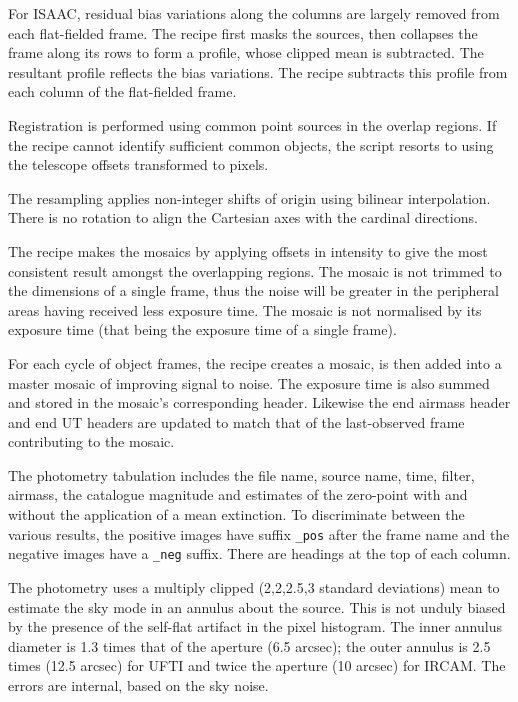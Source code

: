 \documentclass[twoside,11pt,nolof]{starlink}
\begin{document}
{{{         \sstitem
         For ISAAC, residual bias variations along the columns are
         largely removed from each flat-fielded frame.  The recipe first
         masks the sources, then collapses the frame along its rows to form
         a profile, whose clipped mean is subtracted.  The resultant profile
         reflects the bias variations.  The recipe subtracts this profile
         from each column of the flat-fielded frame.

         \sstitem
         Registration is performed using common point sources in the
         overlap regions.  If the recipe cannot identify sufficient common
         objects, the script resorts to using the telescope offsets
         transformed to pixels.

         \sstitem
         The resampling applies non-integer shifts of origin using
         bilinear interpolation.  There is no rotation to align the
         Cartesian axes with the cardinal directions.

         \sstitem
         The recipe makes the mosaics by applying offsets in intensity
         to give the most consistent result amongst the overlapping regions.
         The mosaic is not trimmed to the dimensions of a single frame, thus
         the noise will be greater in the peripheral areas having received
         less exposure time.  The mosaic is not normalised by its exposure
         time (that being the exposure time of a single frame).

         \sstitem
         For each cycle of object frames, the recipe creates a mosaic,
         is then added into a master mosaic of improving signal to noise.
         The exposure time is also summed and stored in the mosaic's corresponding
         header.  Likewise the end airmass header and end UT headers are
	 updated to match that of the last-observed frame contributing
	 to the mosaic.

         \sstitem
         The photometry tabulation includes the file name, source
         name, time, filter, airmass, the catalogue magnitude and
         estimates of the zero-point with and without the application
         of a mean extinction.  To discriminate between the various
         results, the positive images have suffix \texttt{\_pos} after the
         frame name and the negative images have a \texttt{\_neg} suffix.
         There are headings at the top of each column.

         \sstitem
         The photometry uses a multiply clipped (2,2,2.5,3 standard
         deviations) mean to estimate the sky mode in an annulus about
         the source.  This is not unduly biased by the presence of the
         self-flat artifact in the pixel histogram. The inner annulus
         diameter is 1.3 times that of the aperture (6.5 arcsec); the
         outer annulus is 2.5 times (12.5 arcsec) for UFTI and twice
         the aperture (10 arcsec) for IRCAM.  The errors are internal,
         based on the sky noise.

}}}
\end{document}
